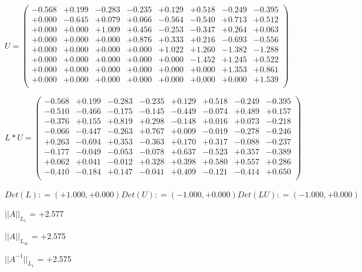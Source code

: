 \documentclass[9pt]{article}
\theoremstyle{plain}
\theoremstyle{definition}
\theoremstyle{remark}
\numberwithin{equation}{section}
\begin{document}
$U = \left(
\begin{array}{
cccccccc}
-0.568 & +0.199 & -0.283 & -0.235 & +0.129 & +0.518 & -0.249 & -0.395 \\
+0.000 & -0.645 & +0.079 & +0.066 & -0.564 & -0.540 & +0.713 & +0.512 \\
+0.000 & +0.000 & +1.009 & +0.456 & -0.253 & -0.347 & +0.264 & +0.063 \\
+0.000 & +0.000 & +0.000 & +0.876 & +0.333 & +0.216 & -0.693 & -0.556 \\
+0.000 & +0.000 & +0.000 & +0.000 & +1.022 & +1.260 & -1.382 & -1.288 \\
+0.000 & +0.000 & +0.000 & +0.000 & +0.000 & -1.452 & +1.245 & +0.522 \\
+0.000 & +0.000 & +0.000 & +0.000 & +0.000 & +0.000 & +1.353 & +0.861 \\
+0.000 & +0.000 & +0.000 & +0.000 & +0.000 & +0.000 & +0.000 & +1.539 \\
\end{array}
\right)$ \newline 

$L * U  = \left(
\begin{array}{
cccccccc}
-0.568 & +0.199 & -0.283 & -0.235 & +0.129 & +0.518 & -0.249 & -0.395 \\
-0.510 & -0.466 & -0.175 & -0.145 & -0.449 & -0.074 & +0.489 & +0.157 \\
-0.376 & +0.155 & +0.819 & +0.298 & -0.148 & +0.016 & +0.073 & -0.218 \\
-0.066 & -0.447 & -0.263 & +0.767 & +0.009 & -0.019 & -0.278 & -0.246 \\
+0.263 & -0.694 & +0.353 & -0.363 & +0.170 & +0.317 & -0.088 & -0.237 \\
-0.177 & -0.049 & -0.053 & -0.078 & +0.637 & -0.523 & +0.357 & -0.389 \\
+0.062 & +0.041 & -0.012 & +0.328 & +0.398 & +0.580 & +0.557 & +0.286 \\
-0.410 & -0.184 & +0.147 & -0.041 & +0.409 & -0.121 & -0.414 & +0.650 \\
\end{array}
\right)$ \newline 

$Det(L) :    = (+1.000,+0.000)     Det(U) :    = (-1.000,+0.000)     Det(LU) :    = (-1.000,+0.000)$

$||A||_{L_1}$  = +2.577

$||A||_{L_{\infty}}$ = +2.575

$||A^{-1}||_{L_1}$  = +2.575
\end{document}
